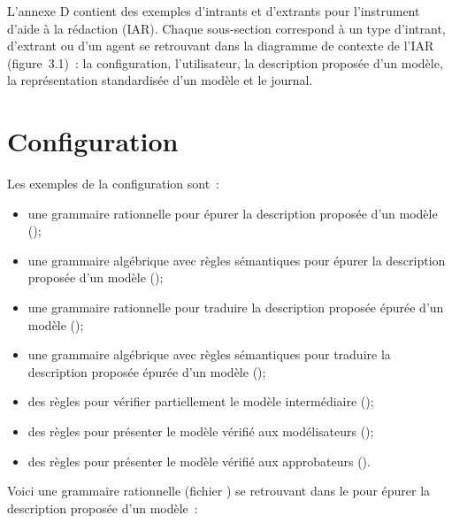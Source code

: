 
L'annexe D contient des exemples d'intrants et d'extrants pour l'instrument d'aide à la rédaction (IAR). Chaque sous-section correspond à un type d'intrant, d'extrant ou d'un agent se retrouvant dans la diagramme de contexte de l'IAR (figure~3.1)~: la configuration, l'utilisateur, la description proposée d'un modèle, la représentation standardisée d'un modèle et le journal.

\section{Configuration}

Les exemples de la configuration sont~: 
\begin{itemize}
    \item une grammaire rationnelle pour épurer la description proposée d'un modèle ();
    \item une grammaire algébrique avec règles sémantiques pour épurer la description proposée d'un modèle ();
    \item une grammaire rationnelle pour traduire la description proposée épurée d'un modèle ();
    \item une grammaire algébrique avec règles sémantiques pour traduire la description proposée épurée d'un modèle ();
    \item des règles pour vérifier partiellement le modèle intermédiaire ();
    \item des règles pour présenter le modèle vérifié aux modélisateurs ();
    \item des règles pour présenter le modèle vérifié aux approbateurs ().
\end{itemize}

\vspace{\baselineskip}\par

Voici une grammaire rationnelle (fichier ) se retrouvant dans le  pour épurer la description proposée d'un modèle~:


